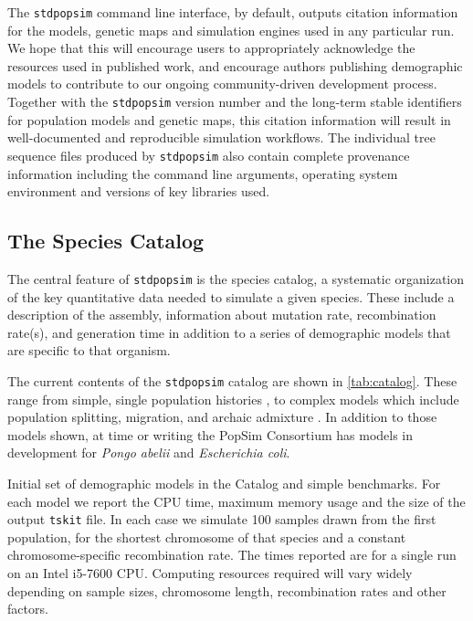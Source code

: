 \documentclass[12pt,halfline,a4paper]{ouparticle}
\newcommand{\stdpopsim}{\texttt{stdpopsim}\xspace}
\newcommand{\tskit}{\texttt{tskit}\xspace}
\begin{document}
The \stdpopsim command line interface, by default, outputs citation information
for the models, genetic maps and simulation engines used in any particular run.
We hope that this will encourage users to appropriately acknowledge the
resources used in published work, and encourage authors
publishing demographic models to contribute to our ongoing community-driven development process.
Together with the \stdpopsim version number and the long-term stable identifiers
for population models and genetic maps,
this citation information will result in well-documented and reproducible
simulation workflows. The individual tree sequence files produced by
\stdpopsim also contain complete provenance information including the command
line arguments, operating system environment and versions of key libraries
used.

\subsection*{The Species Catalog}
The central feature of \stdpopsim is the species catalog, a systematic organization
of the key quantitative data needed to simulate a given species. These include a description
of the assembly, information about mutation rate, recombination rate(s), and generation time
in addition to a series of demographic models that are specific to that organism. 

The current contents of the \stdpopsim catalog are shown in \autoref{tab:catalog}.
These range from
simple, single population histories \cite[e.g.,][]{sheehan2016deep},
to complex models which include population splitting, migration, and archaic
admixture \cite[e.g.,][]{ragsdale2019models}.
In addition to those models shown, at time or writing
the PopSim Consortium has models in development for \textit{Pongo abelii} and \textit{Escherichia coli}.

\renewcommand{\arraystretch}{1.2}
\begin{table}[t]
\makebox[\textwidth][c]{
    \begin{footnotesize}
    
    \end{footnotesize}
}
\caption{\label{tab:catalog}
Initial set of demographic models in the Catalog and simple benchmarks.
For each model we report the CPU time, maximum memory usage and the
size of the output \tskit file. In each case we simulate 100 samples
drawn from the first population, for the shortest chromosome of that species
and a constant chromosome-specific recombination rate.
The times reported are for a single run on an Intel i5-7600 CPU.
Computing resources required will vary widely depending on sample sizes, chromosome length,
recombination rates and other factors.
}
\end{table}
\end{document}
